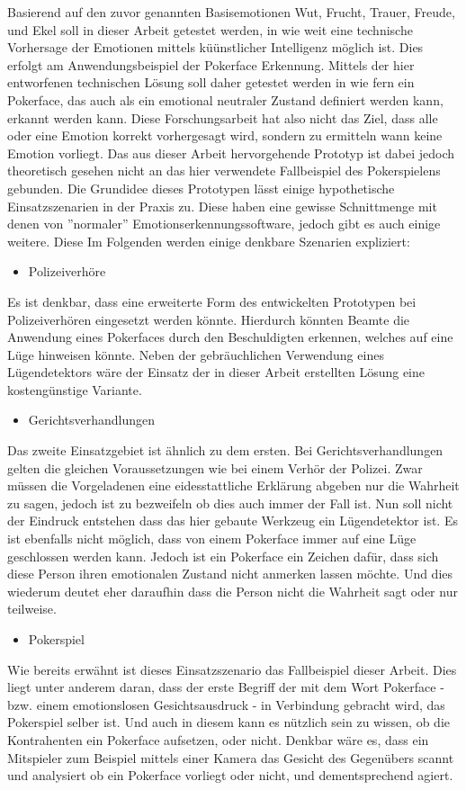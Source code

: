 \documentclass[12pt, a4paper]{scrbook}
\begin{document}
Basierend auf den zuvor genannten Basisemotionen Wut, Frucht, Trauer, Freude, und Ekel soll in dieser Arbeit getestet werden, in wie weit eine technische Vorhersage der Emotionen mittels küünstlicher Intelligenz möglich ist. Dies erfolgt am Anwendungsbeispiel der Pokerface Erkennung. Mittels der hier entworfenen technischen Lösung soll daher getestet werden in wie fern ein Pokerface, das auch als ein emotional neutraler Zustand definiert werden kann, erkannt werden kann.
Diese Forschungsarbeit hat also nicht das Ziel, dass alle oder eine Emotion korrekt vorhergesagt wird, sondern zu ermitteln wann keine Emotion vorliegt.
Das aus dieser Arbeit hervorgehende Prototyp  ist dabei jedoch theoretisch gesehen nicht an das hier verwendete Fallbeispiel des Pokerspielens gebunden. Die Grundidee dieses Prototypen lässt einige hypothetische Einsatzszenarien in der Praxis zu.
 Diese haben eine gewisse Schnittmenge mit denen von ''normaler'' Emotionserkennungssoftware, jedoch gibt es auch einige weitere. Diese  Im Folgenden werden
einige denkbare Szenarien expliziert:
\begin{itemize}
	\item{Polizeiverhöre}
\end{itemize}
Es ist denkbar, dass eine erweiterte Form des entwickelten Prototypen bei Polizeiverhören eingesetzt werden könnte. Hierdurch könnten Beamte die Anwendung eines Pokerfaces durch den Beschuldigten erkennen, welches auf eine Lüge hinweisen könnte. Neben der gebräuchlichen Verwendung eines Lügendetektors wäre der Einsatz der in dieser Arbeit erstellten Lösung eine kostengünstige Variante.
\begin{itemize}
	\item{Gerichtsverhandlungen}
\end{itemize}
Das zweite Einsatzgebiet ist ähnlich zu dem ersten. Bei Gerichtsverhandlungen gelten die gleichen Voraussetzungen wie bei einem Verhör der Polizei. Zwar müssen die Vorgeladenen eine
eidesstattliche Erklärung abgeben nur die Wahrheit zu sagen, jedoch ist zu bezweifeln ob dies auch immer der Fall ist.
Nun soll nicht der Eindruck entstehen dass das hier gebaute Werkzeug ein Lügendetektor ist. Es ist ebenfalls nicht möglich, dass von einem Pokerface immer auf eine Lüge geschlossen werden kann.
Jedoch ist ein Pokerface ein Zeichen dafür, dass sich diese Person ihren emotionalen Zustand nicht anmerken lassen möchte. Und dies wiederum deutet eher daraufhin dass die Person nicht die
Wahrheit sagt oder nur teilweise.
\begin{itemize}
	\item{Pokerspiel}
\end{itemize}
Wie bereits erwähnt ist dieses Einsatzszenario das Fallbeispiel dieser Arbeit. Dies liegt unter anderem daran, dass der erste Begriff der mit dem Wort Pokerface - bzw. einem emotionslosen Gesichtsausdruck -  in Verbindung gebracht wird, das Pokerspiel selber ist. 
Und auch in diesem kann es nützlich sein zu wissen, ob die Kontrahenten ein Pokerface aufsetzen, oder nicht. 
Denkbar wäre es, dass ein Mitspieler zum Beispiel mittels einer Kamera das Gesicht des Gegenübers scannt und analysiert ob ein Pokerface vorliegt oder nicht, und dementsprechend agiert.
\end{document}
